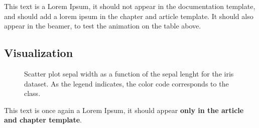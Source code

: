     	 \begin{table}

\centering
{}

\caption{First ten rows corresponding to the Virginica class}
\end{table}
This text is a Lorem Ipsum, it should not appear in the documentation
template, and should add a lorem ipsum in the chapter and article
template. It should also appear in the beamer, to test the animation on
the table above.\par
\lipsum[1-4]

\subsection{Visualization}\label{visualization}

\begin{figure}

\centering
{}

\caption{Scatter plot sepal width as a function of the sepal lenght for the iris dataset. As the legend indicates, the color code corresponds to the class.}
\end{figure}
This text is once again a Lorem Ipsum, it should appear \textbf{only in
the article and chapter template}.\par
\lipsum[5-6]

